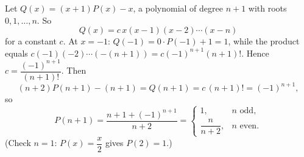 Let $Q(x)=(x+1)P(x)-x$, a polynomial of degree $n+1$ with roots $0,1,\dots,n$. So
\[Q(x)=c\,x(x-1)(x-2)\cdots(x-n)\]
for a constant $c$. At $x=-1$: $Q(-1)=0\cdot P(-1)+1=1$, while the product equals $c(-1)(-2)\cdots(-(n+1))=c(-1)^{n+1}(n+1)!$. Hence $c=\dfrac{(-1)^{n+1}}{(n+1)!}$. Then
\[(n+2)P(n+1)-(n+1)=Q(n+1)=c\,(n+1)!=(-1)^{n+1},\]
so
\[P(n+1)=\dfrac{n+1+(-1)^{n+1}}{n+2}=\boxed{\begin{cases}1,&n\text{ odd},\\[2pt]\dfrac{n}{n+2},&n\text{ even}.\end{cases}}\]
(Check $n=1$: $P(x)=\dfrac x2$ gives $P(2)=1$.)
